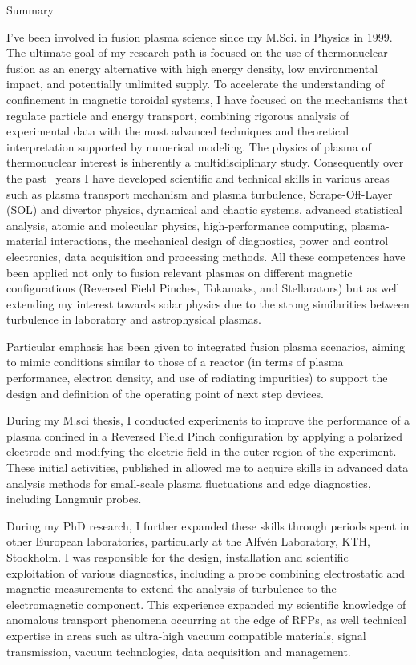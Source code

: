 \begin{cvblock}{Summary}
\end{cvblock}
I've been involved in fusion plasma science since my M.Sci. in
Physics in 1999.
The ultimate goal of my research path is focused on the use of thermonuclear fusion as an energy alternative with high energy density, low environmental impact, and potentially unlimited supply. To accelerate the understanding of confinement in magnetic toroidal systems, I have focused on the mechanisms that regulate particle and energy transport, combining rigorous analysis of experimental data with the most advanced techniques and theoretical interpretation supported by numerical modeling. 
The physics of plasma of thermonuclear interest is inherently a
multidisciplinary study. Consequently 
over the past 
\FPtrunc{}\mydegree\ years
I have developed scientific and technical skills in various areas such
as plasma transport mechanism and plasma turbulence, Scrape-Off-Layer
(SOL) and divertor physics,  dynamical and chaotic systems, advanced statistical analysis,  
atomic and molecular physics,
high-performance computing, plasma-material interactions,
the mechanical design of diagnostics, power and control electronics,
data acquisition and processing methods. All these competences have
been applied not only to fusion relevant plasmas on different magnetic configurations 
 (Reversed Field Pinches, Tokamaks, and Stellarators) but as well
 extending my interest towards solar physics due to
 the strong similarities between turbulence in laboratory and
 astrophysical plasmas. 

Particular emphasis has been given to integrated fusion plasma
scenarios, aiming  to mimic conditions similar to those of a reactor
(in terms of plasma performance, electron density, and use of
radiating impurities) to support the design and definition of the
operating point of next step devices. 

During my M.sci thesis, I conducted experiments to improve the
performance of a plasma confined in a Reversed Field Pinch
configuration by applying a polarized electrode and modifying the
electric field in the outer region of the experiment. These initial
activities, published in  \cite{Antoni:2000p3587} allowed me to
acquire skills in advanced
data analysis methods for small-scale plasma fluctuations and edge diagnostics, including Langmuir probes.

During my PhD research, I further expanded these skills through
periods spent in other European laboratories, particularly at the
Alfvén Laboratory, KTH, Stockholm.  I was responsible for the design,
installation and scientific exploitation of various diagnostics,
including a probe combining electrostatic and magnetic measurements to
extend the analysis of turbulence to the electromagnetic
component. This experience expanded my scientific knowledge of
anomalous transport phenomena occurring at the edge of RFPs, as well technical expertise in areas such as ultra-high vacuum compatible materials, signal transmission, vacuum technologies, data acquisition and management.

